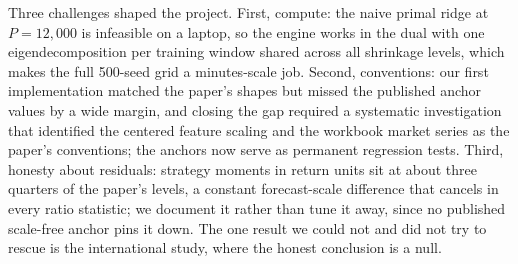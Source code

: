 \documentclass[12pt]{article}
\begin{document}
Three challenges shaped the project. First, compute: the naive primal ridge
at $P = 12{,}000$ is infeasible on a laptop, so the engine works in the dual
with one eigendecomposition per training window shared across all shrinkage
levels, which makes the full 500-seed grid a minutes-scale job. Second,
conventions: our first implementation matched the paper's shapes but missed
the published anchor values by a wide margin, and closing the gap required a
systematic investigation that identified the centered feature scaling and
the workbook market series as the paper's conventions; the anchors now serve
as permanent regression tests. Third, honesty about residuals: strategy
moments in return units sit at about three quarters of the paper's levels, a
constant forecast-scale difference that cancels in every ratio statistic; we
document it rather than tune it away, since no published scale-free anchor
pins it down. The one result we could not and did not try to rescue is the
international study, where the honest conclusion is a null.



\end{document}
